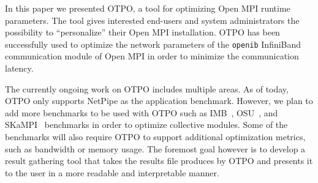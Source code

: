 In this paper we presented OTPO, a tool for optimizing Open MPI
runtime parameters.  The tool gives interested end-users and system
administrators the possibility to ``personalize'' their Open MPI
installation. OTPO has been successfully used to optimize the network
parameters of the {\tt openib} InfiniBand communication module of Open
MPI in order to minimize the communication latency.

The currently ongoing work on OTPO includes multiple areas. As of
today, OTPO only supports NetPipe as the application
benchmark. However, we plan to add more benchmarks to be used with
OTPO such as IMB~\cite{imb}, OSU~\cite{osu}, and SKaMPI~\cite{skampi}
benchmarks in order to optimize collective modules. Some of the
benchmarks will also require OTPO to support additional optimization
metrics, such as bandwidth or memory usage. The foremost goal however
is to develop a result gathering tool that takes the results file
produces by OTPO and presents it to the user in a more readable and
interpretable manner.
